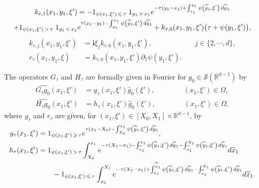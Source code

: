 \documentclass[AHL,Unicode,longabstracts]{cedram}
\newcommand{\scS}{\mathscr{S}}
\newcommand*\R{\mathbb{R}}
\renewcommand{\i}{\mathbf{i}}
\renewcommand{\leq}{\leqslant}
\renewcommand{\geq}{\geqslant}
\renewcommand{\tilde}{\widetilde}
\let\oldtilde\tilde
\renewcommand*{\tilde}[1]{\mathchoice{\widetilde{#1}}{\widetilde{#1}}{\oldtilde{#1}}{\oldtilde{#1}}}
\begin{document}
\begin{prop}
\begin{multline}
\end{multline}
\begin{multline}\label{Def-k-tau-1-x1-y1-xi'}
k_{\tau,1} (x_1,y_1, \xi') = - 1_{\psi(x_1, \xi')\, \leq\,\tau}\; 1_{y_1\,>\,x_1} e^{-\tau(y_1-x_1)+\int_{x_1}^{y_1} \psi\left(\tilde{y}_1,\xi'\right) \, d \tilde{y}_1}
\\
+ 1_{\psi(x_1,\xi')\,>\,\tau}\; 1_{y_1\,<\,x_1} e^{\tau(x_1-y_1) - \int_{y_1}^{x_1} \psi\left(\tilde{y}_1,\xi'\right) \, d \tilde{y}_1} + k_{\tau,0}(x_1,y_1,\xi') \big(\tau + \psi(y_1,\xi')\big),
\end{multline}
\begin{equation}\label{Def-k-tau-j-x1-y1-xi'}
\begin{split}
k_{\tau,j}(x_1, y_1, \xi') & = \i \xi_j k_{\tau,0}(x_1,y_1, \xi'), \qquad\qquad \qquad j \in \{2, \cdots, d\},
\\
r_\tau(x_1,y_1, \xi) & = k_{\tau, 0}(x_1,y_1, \xi') \partial_1 \psi(y_1,\xi').
\end{split} 
\end{equation}

The operators $G_\tau$ and $H_\tau$ are formally given in Fourier for $g_0 \in \scS(\R^{d-1})$ by
\begin{equation}\label{Def-G-tau-Fourier}
\begin{aligned}
\widehat {G_{\tau} g_0}(x_1, \xi') & = g_{\tau}(x_1, \xi') \widehat g_0(\xi'),
\qquad \qquad(x_1, \xi') \in \Omega,
\\
\widehat {H_{\tau} g_0}(x_1, \xi') & = h_\tau(x_1, \xi') \widehat g_0(\xi'),
\qquad \qquad(x_1, \xi') \in \Omega,
\end{aligned}
\end{equation}
where $g_\tau$ and $r_\tau$ are given, for $(x_1, \xi') \in [X_0,X_1] \times \R^{d-1}$, by
\begin{equation}\label{Def-g-tau-x1-xi'}
\begin{split}
g_{\tau}(x_1, \xi') & = 1_{\psi(x_1,\xi')\, \geq\,\tau} e^{\tau (x_1-X_0)- \int_{X_0}^{x_1} \psi\left(\tilde{y}_1, \xi'\right) \, d \tilde{y}_1 },
\\
h_\tau(x_1,\xi') & = 1_{\psi(x_1,\xi')\,>\,\tau} \int_{X_0}^{x_1} e^{-\tau(X_1-x_1) - \int_{\tilde x_1}^{x_1} \psi\left(\tilde y_1, \xi'\right) \, d\tilde y_1 - \int_{\tilde x_1}^{X_1} \psi\left(\tilde y_1, \xi'\right) \, d\tilde y_1 } d\tilde x_1
\\
& \qquad - 1_{\psi(x_1,\xi')\,\leq\,\tau} \int_{x_1}^{X_1} e^{-\tau(X_1-x_1) +\int_{x_1}^{\tilde x_1} \psi\left(\tilde y_1, \xi'\right) \, d\tilde y_1 - \int_{\tilde x_1}^{X_1} \psi\left(\tilde y_1, \xi'\right) \, d\tilde y_1} d\tilde x_1.
\end{split}
\end{equation}
\end{prop}
\end{document}
